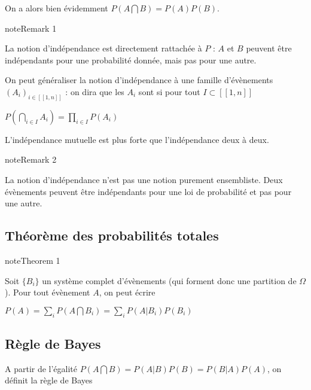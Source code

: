 \documentclass[letterpaper,10pt,french]{sphinxmanual}
\begin{document}
\sphinxAtStartPar
On a alors bien évidemment \(P(A\bigcap B) = P(A)P(B)\).
\label{Rappels:remark-14}
\begin{sphinxadmonition}{note}{Remark 1}



\sphinxAtStartPar
La notion d’indépendance est directement rattachée à \(P\) : \(A\) et \(B\) peuvent être indépendants pour une probabilité donnée, mais pas pour une autre.
\end{sphinxadmonition}

\sphinxAtStartPar
On peut généraliser la notion d’indépendance à une famille d’évènements \((A_i)_{i\in[\![1,n]\!]}\) : on dira que les \(A_i\) sont  si pour tout \(I\subset [\![1,n]\!]\)

\sphinxAtStartPar
\(P\left (\displaystyle\bigcap_{i\in I} A_i\right ) = \displaystyle\prod_{i\in I} P(A_i)\)

\sphinxAtStartPar
L’indépendance mutuelle est plus forte que l’indépendance deux à deux.
\label{Rappels:remark-15}
\begin{sphinxadmonition}{note}{Remark 2}



\sphinxAtStartPar
La notion d’indépendance n’est pas une notion purement ensembliste. Deux évènements peuvent être indépendants pour une loi de probabilité et pas pour une autre.
\end{sphinxadmonition}


\subsection{Théorème des probabilités totales}
\label{\detokenize{Rappels:theoreme-des-probabilites-totales}}\label{Rappels:theorem-16}
\begin{sphinxadmonition}{note}{Theorem 1}



\sphinxAtStartPar
Soit \(\{B_i\}\) un système complet d’évènements (qui forment donc une partition de \(\Omega\)). Pour tout évènement \(A\), on peut écrire

\sphinxAtStartPar
\(P(A) = \displaystyle\sum_i P(A\bigcap B_i) = \displaystyle\sum_i P(A| B_i) P(B_i)\)
\end{sphinxadmonition}


\subsection{Règle de Bayes}
\label{\detokenize{Rappels:regle-de-bayes}}
\ignorespaces 
\sphinxAtStartPar
A partir de l’égalité \(P(A\bigcap B) = P(A|B)P(B)=P(B|A)P(A)\), on définit la règle de Bayes
\end{document}
